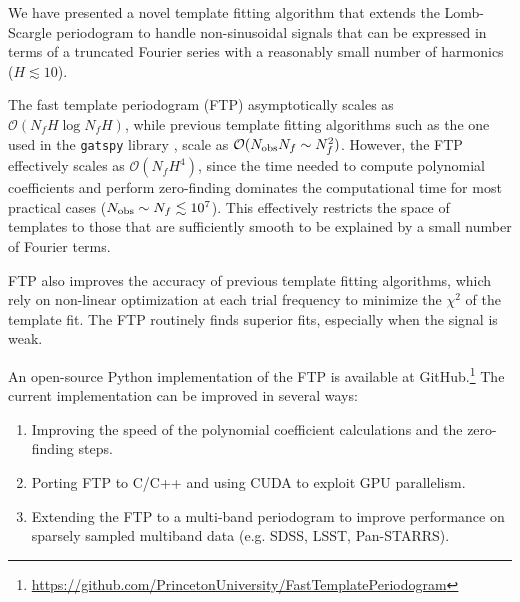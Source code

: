 \documentclass[iop]{emulateapj}
\newcommand{\bigO}{\mathcal{O}}
\begin{document}
We have presented a novel template fitting algorithm that extends
the Lomb-Scargle periodogram \citep{Lomb_1976,Scargle_1982,Barning_1963,Vanicek_1971}
to handle non-sinusoidal signals that can be expressed in terms of
a truncated Fourier series with a reasonably small number of harmonics
($H\lesssim 10$). 

The fast template periodogram (FTP) asymptotically scales as 
$\bigO(N_fH\log N_fH)$, while previous template fitting algorithms
such as the one used in the \texttt{gatspy} library \citep{gatspy},
scale as $\bigO(N_{\rm obs}N_f\sim N_f^2)$. However, the FTP effectively
scales as $\bigO(N_fH^4)$, since the time needed to compute polynomial
coefficients and perform zero-finding dominates the computational time
for most practical cases ($N_{\rm obs}\sim N_f \lesssim 10^7$).
This effectively restricts the space of templates to those that are
sufficiently smooth to be explained by a small number of Fourier terms.

FTP also improves the accuracy of previous template fitting algorithms, 
which rely on non-linear optimization at each trial frequency to minimize
the $\chi^2$ of the template fit. The FTP routinely finds superior fits,
especially when the signal is weak.

An open-source Python implementation of the FTP is available at
GitHub.\footnote{\url{https://github.com/PrincetonUniversity/FastTemplatePeriodogram}} 
The current implementation can be improved in several ways:

\begin{enumerate}
    \item Improving the speed of the polynomial
          coefficient calculations and the zero-finding steps.
    \item Porting FTP to C/C++ and using CUDA to exploit GPU parallelism.
    \item Extending the FTP to a multi-band periodogram to improve performance
          on sparsely sampled multiband data (e.g. SDSS, LSST, Pan-STARRS).
\end{enumerate}
\end{document}
